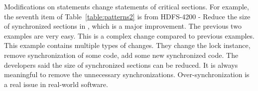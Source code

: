 %

Modifications on statements change statements of critical sections. For example, the seventh item of Table~\ref{table:patterns2} is from HDFS-4200 - Reduce the size of synchronized sections in , which is a major improvement. The previous two examples are very easy. This is a complex change compared to previous examples. This example contains multiple types of changes. They change the lock instance, remove synchronization of some code, add some new synchronized code. The developers said the size of synchronized sections can be reduced. It is always meaningful to remove the unnecessary synchronizations. Over-synchronization \cite{conf/sigsoft/GuJSZL15} is a real issue in real-world software.








